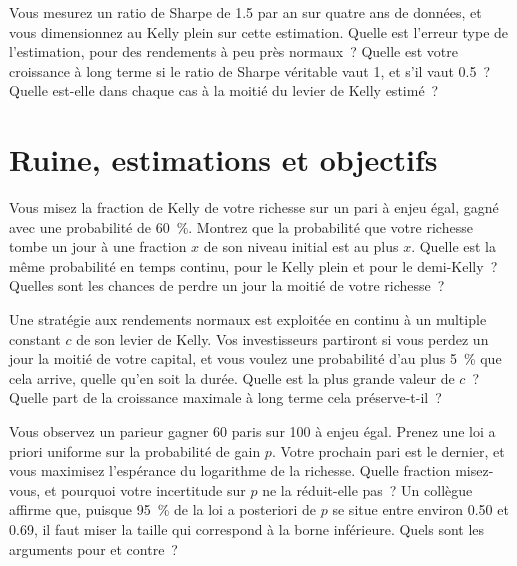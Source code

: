 \begin{question}\label{iq:iv2:betting-and-kelly:25}
Vous mesurez un ratio de Sharpe de 1.5 par an sur quatre ans de données, et vous dimensionnez au Kelly plein sur cette estimation. Quelle est l'erreur type de l'estimation, pour des rendements à peu près normaux~? Quelle est votre croissance à long terme si le ratio de Sharpe véritable vaut 1, et s'il vaut 0.5~? Quelle est-elle dans chaque cas à la moitié du levier de Kelly estimé~?
\end{question}

\section{Ruine, estimations et objectifs}

\begin{question}\label{iq:iv2:betting-and-kelly:26}
Vous misez la fraction de Kelly de votre richesse sur un pari à enjeu égal, gagné avec une probabilité de 60~\%. Montrez que la probabilité que votre richesse tombe un jour à une fraction $x$ de son niveau initial est au plus $x$. Quelle est la même probabilité en temps continu, pour le Kelly plein et pour le demi-Kelly~? Quelles sont les chances de perdre un jour la moitié de votre richesse~?
\end{question}

\begin{question}\label{iq:iv2:betting-and-kelly:27}
Une stratégie aux rendements normaux est exploitée en continu à un multiple constant $c$ de son levier de Kelly. Vos investisseurs partiront si vous perdez un jour la moitié de votre capital, et vous voulez une probabilité d'au plus 5~\% que cela arrive, quelle qu'en soit la durée. Quelle est la plus grande valeur de $c$~? Quelle part de la croissance maximale à long terme cela préserve-t-il~?
\end{question}

\begin{question}\label{iq:iv2:betting-and-kelly:28}
Vous observez un parieur gagner 60 paris sur 100 à enjeu égal. Prenez une loi a priori uniforme sur la probabilité de gain $p$. Votre prochain pari est le dernier, et vous maximisez l'espérance du logarithme de la richesse. Quelle fraction misez-vous, et pourquoi votre incertitude sur $p$ ne la réduit-elle pas~? Un collègue affirme que, puisque 95~\% de la loi a posteriori de $p$ se situe entre environ 0.50 et 0.69, il faut miser la taille qui correspond à la borne inférieure. Quels sont les arguments pour et contre~?
\end{question}

